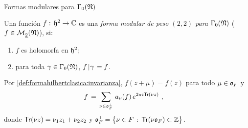 \begin{frame}{Formas modulares para $\Gamma_{0}(\frak{N})$}
	\begin{defFormaHilbertClasica}\label{def:formahilbertclasica}
		Una funci\'{o}n $f:\,\hP^2\rightarrow\bb{C}$ es una
		\emph{forma modular de peso $(2,2)$ para %
		$\Gamma_{0}(\frak{N})$} ($f\in\modularH{2}{\frak{N}}$), si:
		\begin{enumerate}
			\item\label{def:formahilbertclasica:holomorfia}
				$f$ es holomorfa en $\hP^2$;
			\item\label{def:formahilbertclasica:invarianza}
				para toda
				$\gamma\in\Gamma_{0}(\frak{N})$,
				\begin{math}
					f\operadormatrices{\null}{\gamma}=f
				\end{math}.
			\seti
		\end{enumerate}
	\end{defFormaHilbertClasica}
	\begin{obsDesarrolloDeFou}%
		\label{obs:desarrollodefou}
		Por \ref{def:formahilbertclasica:invarianza}, $f(z+\mu)=f(z)$
		para todo $\mu\in\oka F$ y
		\begin{align*}
			f & \,=\,\sum_{\nu\in\oka F^{\perp}}\,a_{\nu}(f)\,
				e^{2\pi i \traza(\nu z)}
			\text{ ,}
		\end{align*}
		donde $\traza(\nu z)=\nu_1z_1+\nu_2z_2$ y
		\begin{math}
			\oka F^{\perp}=\big\{
				\nu\in F\,:\,\traza(\nu\oka F)\subset\bb{Z}
				\big\}
		\end{math}.
	\end{obsDesarrolloDeFou}
\end{frame}


